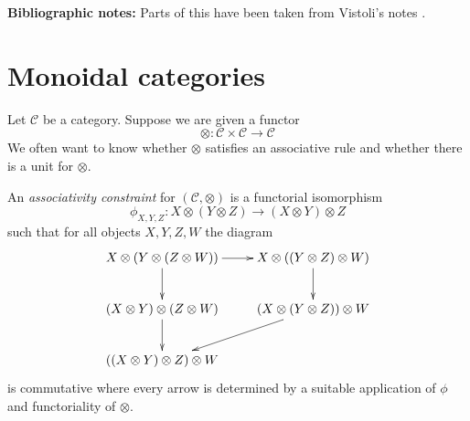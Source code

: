 \noindent
{\bf Bibliographic notes:}
Parts of this have been taken from Vistoli's notes \cite{Vis2}.





\section{Monoidal categories}
\label{section-monoidal}

\noindent
Let $\mathcal{C}$ be a category. Suppose we are given a functor
$$
\otimes : \mathcal{C} \times \mathcal{C} \longrightarrow \mathcal{C}
$$
We often want to know whether $\otimes$ satisfies an associative rule
and whether there is a unit for $\otimes$.

\medskip\noindent
An {\it associativity constraint} for $(\mathcal{C}, \otimes)$ is
a functorial isomorphism
$$
\phi_{X, Y, Z} : X \otimes (Y \otimes Z) \to (X \otimes Y) \otimes Z
$$
such that for all objects $X, Y, Z, W$ the diagram
\begin{equation}
\label{equation-pentagon}
\vcenter{
\xymatrix{
X \otimes (Y \otimes ( Z \otimes W)) \ar[r] \ar[d] &
X \otimes ((Y \otimes Z) \otimes W) \ar[d] \\
(X \otimes Y) \otimes (Z \otimes W) \ar[d] &
(X \otimes (Y \otimes Z)) \otimes W \ar[ld] \\
((X \otimes Y) \otimes Z) \otimes W
}
}
\end{equation}
is commutative where every arrow is determined by a suitable application
of $\phi$ and functoriality of $\otimes$.

